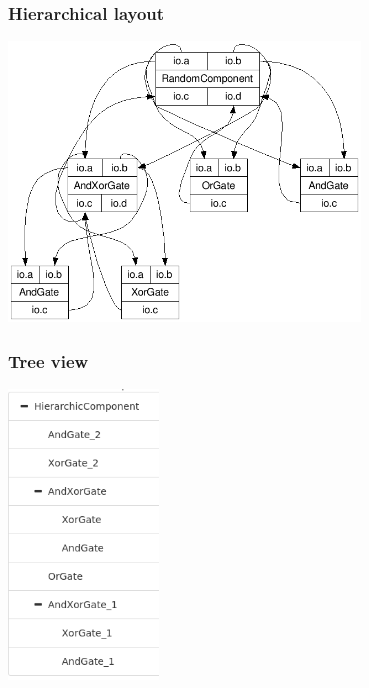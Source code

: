 \documentclass[11pt, handout]{beamer}
\begin{document}
\begin{frame}
  \frametitle{Hierarchical layout}
  \begin{center}
    \includegraphics[width=0.7\textwidth]{hierarchical_layout}
  \end{center}
\end{frame}

\begin{frame}
  \frametitle{Tree view}
  \begin{center}
    \includegraphics[width=0.3\textwidth]{tree_view}
  \end{center}
\end{frame}
\end{document}
